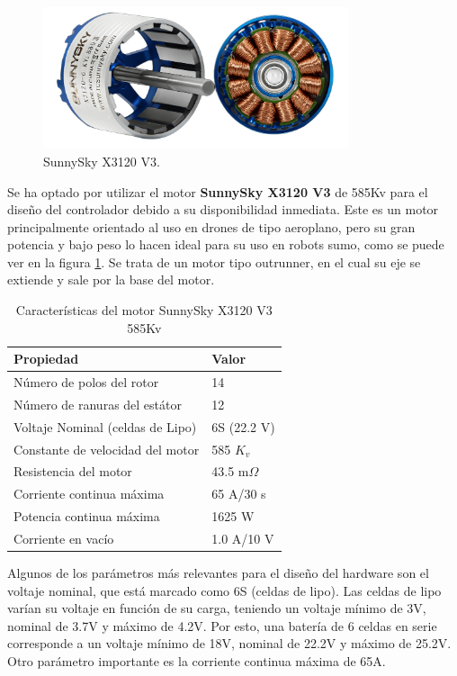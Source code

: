 \documentclass[11pt]{report}
\begin{document}
\begin{figure}[ht]
	\centering
	\includegraphics[width=0.8\textwidth]{imagenes/Motor/X3120.png}
	\caption{SunnySky X3120 V3.}
	\label{X3120}
\end{figure}
\FloatBarrier
\newpage
Se ha optado por utilizar el motor \textbf{SunnySky X3120 V3} de 585Kv para el diseño del controlador debido a su disponibilidad inmediata. Este es un motor principalmente orientado al uso en drones de tipo aeroplano, pero su gran potencia y bajo peso lo hacen ideal para su uso en robots sumo, como se puede ver en la figura \ref{X3120}. Se trata de un motor tipo outrunner, en el cual su eje se extiende y sale por la base del motor.

\begin{table}[h!]
	\centering
	\caption{Características del motor SunnySky X3120 V3 585Kv}
	\begin{tabular}{l l}
		\hline
		\textbf{Propiedad}               & \textbf{Valor} \\
		\hline
		Número de polos del rotor        & 14             \\
		Número de ranuras del estátor    & 12             \\
		Voltaje Nominal (celdas de Lipo) & 6S (22.2 V)    \\
		Constante de velocidad del motor & 585 $K_v$      \\
		Resistencia del motor            & 43.5 m$\Omega$ \\
		Corriente continua máxima        & 65 A/30 s      \\
		Potencia continua máxima         & 1625 W         \\
		Corriente en vacío               & 1.0 A/10 V     \\
		\hline
	\end{tabular}
\end{table}
\FloatBarrier

Algunos de los parámetros más relevantes para el diseño del hardware son el voltaje nominal, que está marcado como 6S (celdas de lipo). Las celdas de lipo varían su voltaje en función de su carga, teniendo un voltaje mínimo de 3V, nominal de 3.7V y máximo de 4.2V. Por esto, una batería de 6 celdas en serie corresponde a un voltaje mínimo de 18V, nominal de 22.2V y máximo de 25.2V. Otro parámetro importante es la corriente continua máxima de 65A.
\end{document}

